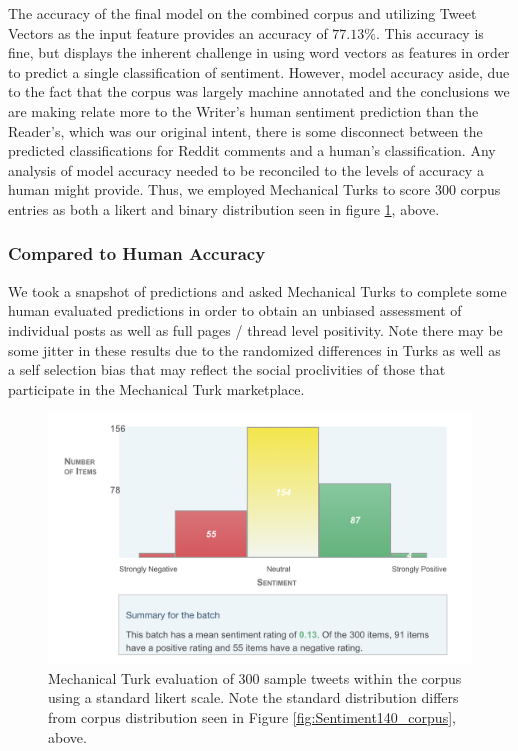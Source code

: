 \documentclass[11pt]{article}
\begin{document}
The accuracy of the final model on the combined corpus and utilizing Tweet 
Vectors as the input feature provides an accuracy of \(77.13\%\). This accuracy is 
fine, but displays the inherent challenge in using word vectors as features in order 
to predict a single classification of sentiment. However, model accuracy aside, due to 
the fact that the corpus was largely machine annotated and the conclusions we are 
making relate more to the Writer's human sentiment prediction than the Reader's, which 
was our original intent, there is some disconnect between the predicted 
classifications for Reddit comments and a human's classification. Any analysis of 
model accuracy needed to be reconciled to the levels of accuracy a human might 
provide. Thus, we employed Mechanical Turks to score 300 corpus entries as both a 
likert and binary distribution seen in figure \ref{fig:mturk_assess}, above.  

\subsubsection{Compared to Human Accuracy}

We took a snapshot of predictions and asked Mechanical Turks to complete some human 
evaluated predictions in order to obtain an unbiased 
assessment of individual posts as well as full pages / thread level positivity. Note 
there may be some jitter in these results due to the randomized differences in Turks 
as well as a self selection bias that may reflect the social 
proclivities of those that participate in the Mechanical Turk marketplace.

\begin{figure}
  \includegraphics[width=\linewidth]{mturk_corpus_eval.png}
  \caption{Mechanical Turk evaluation of 300 sample tweets within 
  the corpus using a standard likert scale. Note the standard 
  distribution differs from corpus distribution seen in Figure 
  \ref{fig:Sentiment140_corpus}, above.}
  \label{fig:mturk_assess}
\end{figure}
\end{document}
